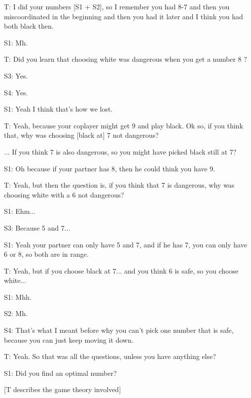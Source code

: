 \documentclass[a4paper,superscriptaddress,nofootinbib]{revtex4}
\begin{document}
T: I did your numbers [S1 + S2], so I remember you had 8-7 and then you miscoordinated in the beginning and then you had it later and I think you had both black then.

S1: Mh.

T: Did you learn that choosing white was dangerous when you get a number 8 ?

S3: Yes.

S4: Yes.

S1: Yeah I think that's how we lost.

T: Yeah, because your coplayer might get 9 and play black. Ok so, if you think that, why was choosing [black at] 7 not dangerous? 

... If you think 7 is also dangerous, so you might have picked black still at 7?

S1: Oh because if your partner has 8, then he could think you have 9.

T: Yeah, but then the question is, if you think that 7 is dangerous, why was choosing white with a 6 not dangerous?

S1: Ehm...

S3: Because 5 and 7...

S1: Yeah your partner can only have 5 and 7, and if he has 7, you can only have 6 or 8, so both are in range.

T: Yeah, but if you choose black at 7... and you think 6 is safe, so you choose white...

S1: Mhh.

S2: Mh.

S4: That's what I meant before why you can't pick one number that is safe, because you can just keep moving it down.

T: Yeah. So that was all the questions, unless you have anything else?

S1: Did you find an optimal number?

[T describes the game theory involved]
 
\end{document}
